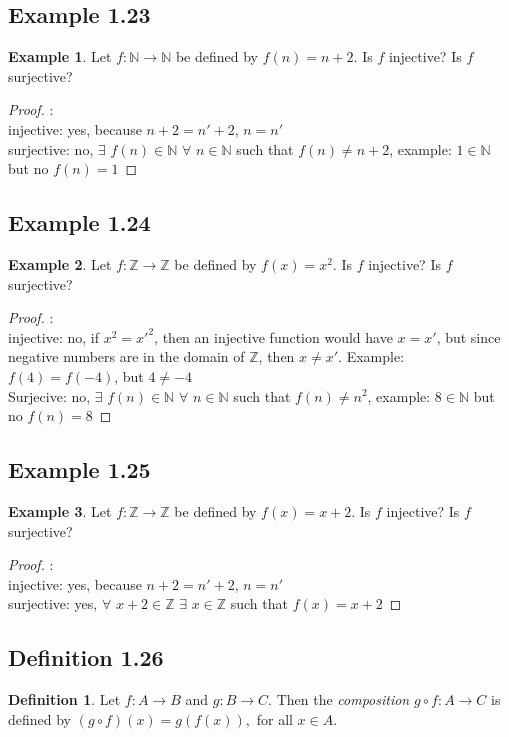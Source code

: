 \documentclass[openany, amssymb, psamsfonts]{amsart}
\theoremstyle{definition}
\newtheorem{defn}{Definition}[section]
\newtheorem{exmp}{Example}[section]
\numberwithin{equation}{section}
\begin{document}
\subsection{Example 1.23}
\begin{exmp}
    Let $f:{\mathbb N}\rightarrow {\mathbb N}$ be defined by $f(n)=n+2$.  Is $f$ injective?  Is $f$ surjective?
\end{exmp}
\begin{proof}:\\
    injective: yes, because $n+2 = n'+2$, $n=n'$\\
surjective:  no, $\exists$ $f(n)\in \mathbb N $ $ \forall $ $ n \in \mathbb N$ such that $f(n) \neq n+2$, example:
$1 \in \mathbb N$ but no $f(n) = 1$
\end{proof}
\subsection{Example 1.24}
\begin{exmp}
    Let $f:{\mathbb Z}\rightarrow {\mathbb Z}$ be defined by $f(x)=x^2$.  Is $f$ injective?  Is $f$ surjective?
\end{exmp}
\begin{proof}:\\
    injective: no, if $x^2 = x'^2$, then an injective function would have $x=x'$, but since negative numbers are in the domain of $\mathbb Z$, then $x\neq x'$.
Example: $f(4)=f(-4)$, but $4\neq -4$ \\
Surjecive: no, $\exists$ $ f(n)\in \mathbb N $ $ \forall $ $ n \in \mathbb N$ such that $f(n) \neq n^2$, example: $8 \in \mathbb N$ but no $f(n) = 8$
\end{proof}
\subsection{Example 1.25}
\begin{exmp}
    Let $f:{\mathbb Z}\rightarrow {\mathbb Z}$ be defined by $f(x)=x+2$.  Is $f$ injective?  Is $f$ surjective?
\end{exmp}
\begin{proof}:\\
    injective: yes, because $n+2 = n'+2$, $n=n'$\\
surjective: yes, $\forall $ $ x+2\in \mathbb Z$ $  \exists $ $  x \in \mathbb Z $ such that $f(x) = x+2$
\end{proof}
\subsection{Definition 1.26}
\begin{defn}
Let $f:A\longrightarrow B$ and $g:B\longrightarrow C. $ Then the \emph{composition} $g\circ f: A\longrightarrow C$ is defined by $(g\circ f)(x)=g(f(x)),$ for all $x\in A.$ 
\end{defn}
\end{document}
